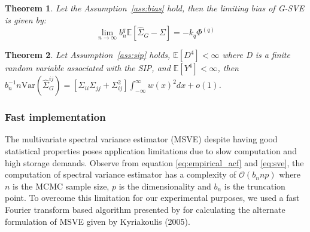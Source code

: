 \documentclass[11pt]{article}
\newcommand{\E}{\mathbb{E}}
\newcommand{\Var}{\text{Var}}
\newtheorem{theorem}{Theorem}
\theoremstyle{remark}
\begin{document}
\begin{theorem}\label{th:G-SVE_bias}
Let the Assumption~\ref{ass:bias} hold, then the limiting bias of G-SVE is given by:
\[
 \lim_{n \to \infty}b_n^q\mathbb{E} \left[\hat{\Sigma}_{G} - \Sigma \right] = -k_q\Phi^{(q)}
 \]
\end{theorem}




\begin{theorem} \label{th:G-SVE_variance}
 Let Assumption~\ref{ass:sip} holds, $\E[D^4] < \infty$ where D is a finite random variable associated with the SIP, and  $\E[Y^4] < \infty$, then $b_n^{-1}{n}\Var \left(\hat{\Sigma}_{G}^{ij} \right) = [\Sigma_{ii}\Sigma_{jj} + \Sigma_{ij}^2]\int_{-\infty}^{\infty}w(x)^2dx  + o(1)$.
\end{theorem}




\subsubsection{Fast implementation} %
\label{ssub:fast_implementation}

The multivariate spectral variance estimator (MSVE) despite having good statistical properties poses application limitations due to slow computation and high storage demands. Observe from equation \ref{eq:empirical_acf} and \ref{eq:sve}, the computation of spectral variance estimator has a complexity of $\mathcal{O}(b_n n p)$ where $n$ is the MCMC sample size, $p$ is the dimensionality and $b_n$ is the truncation point. To overcome this limitation for our experimental purposes, we used a fast Fourier transform based algorithm presented by \cite{heberle2017fast} for calculating the alternate formulation of MSVE given by Kyriakoulis (2005).\\
\end{document}
